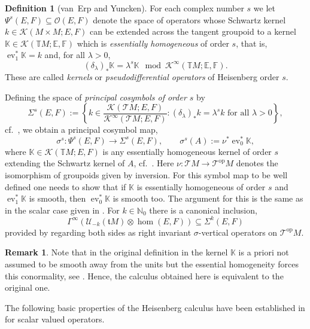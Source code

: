 \documentclass[reqno,12pt]{amsart}
\DeclareMathOperator{\ev}{ev}
\newcommand\N{\mathbb N}
\newcommand\K{\mathbb K}
\newcommand\op{\textrm{op}}
\theoremstyle{plain}
\theoremstyle{definition}
\newtheorem{definition}[theorem]{Definition}
\newtheorem{remark}[theorem]{Remark}
\begin{document}
\begin{definition}[van~Erp and Yuncken]
For each complex number $s$ we let $\Psi^s(E,F)\subseteq\mathcal O(E,F)$ denote the space of operators whose Schwartz kernel $k\in\mathcal K(M\times M;E,F)$ can be extended across the tangent groupoid to a kernel $\K\in\mathcal K(\mathbb TM;\mathbb E,\mathbb F)$ which is \emph{essentially homogeneous} of order $s$, that is, $\ev_1^*\K=k$ and, for all $\lambda>0$,
$$
(\delta_\lambda)_*\K=\lambda^s\K\mod\mathcal K^\infty(\mathbb TM;\mathbb E,\mathbb F).
$$
These are called \emph{kernels} or \emph{pseudodifferential operators} of Heisenberg order $s$.
\end{definition}


Defining the space of \emph{principal cosymbols of order $s$} by
$$
\Sigma^s(E,F)
:=\left\{k\in\frac{\mathcal K(\mathcal TM;E,F)}{\mathcal K^\infty(\mathcal TM;E,F)}:\textrm{$(\delta_\lambda)_*k=\lambda^sk$ for all $\lambda>0$}\right\},
$$
cf.\ \cite[Definition~46]{EY15}, we obtain a principal cosymbol map,
$$
\sigma^s\colon\Psi^s(E,F)\to\Sigma^s(E,F),\qquad\sigma^s(A):=\nu^*\ev_0^*\K,
$$
where $\K\in\mathcal K(\mathbb TM;E,F)$ is any essentially homogeneous kernel of order $s$ extending the Schwartz kernel of $A$, cf.\ \cite[Definition~48]{EY15}.
Here $\nu\colon\mathcal TM\to\mathcal T^\op M$ denotes the isomorphism of groupoids given by inversion.
For this symbol map to be well defined one needs to show that if $\K$ is essentially homogeneous of order $s$ and $\ev_1^*\K$ is smooth, then $\ev_0^*\K$ is smooth too.
The argument for this is the same as in the scalar case given in \cite[Proposition~45]{EY15}.
For $k\in\N_0$ there is a canonical inclusion,
\begin{equation}\label{E:incUS}
\Gamma^\infty(\mathcal U_{-k}(\mathfrak tM)\otimes\hom(E,F))\subseteq\Sigma^k(E,F)
\end{equation}
provided by regarding both sides as right invariant $\sigma$-vertical operators on $\mathcal T^\op M$.


\begin{remark}\label{R:conormal}
Note that in the original definition in \cite{EY15} the kernel $\K$ is a priori not assumed to be smooth away from the units but the essential homogeneity forces this conormality, see \cite[Proposition~41]{EY15}.
Hence, the calculus obtained here is equivalent to the original one.
\end{remark}


The following basic properties of the Heisenberg calculus have been established in \cite{EY15} for scalar valued operators. 
\end{document}
